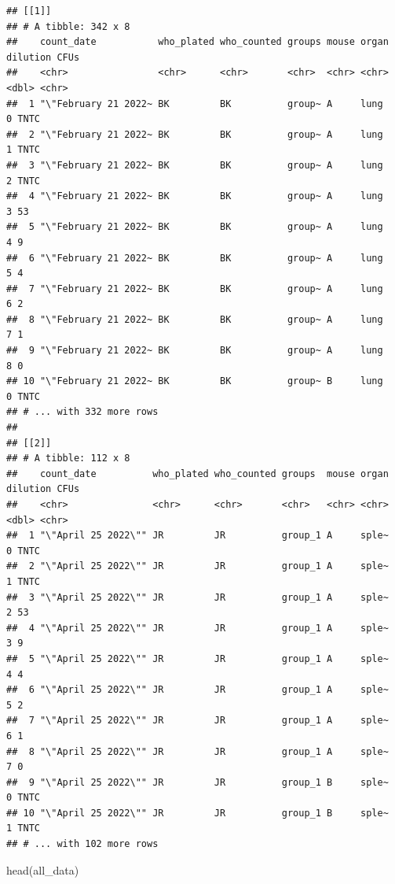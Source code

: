 \documentclass[
]{book}
\newenvironment{Shaded}{\begin{snugshade}}{\end{snugshade}}
\newcommand{\FunctionTok}[1]{\textcolor[rgb]{0.00,0.00,0.00}{#1}}
\newcommand{\NormalTok}[1]{#1}
\begin{document}
\begin{verbatim}
## [[1]]
## # A tibble: 342 x 8
##    count_date           who_plated who_counted groups mouse organ dilution CFUs 
##    <chr>                <chr>      <chr>       <chr>  <chr> <chr>    <dbl> <chr>
##  1 "\"February 21 2022~ BK         BK          group~ A     lung         0 TNTC 
##  2 "\"February 21 2022~ BK         BK          group~ A     lung         1 TNTC 
##  3 "\"February 21 2022~ BK         BK          group~ A     lung         2 TNTC 
##  4 "\"February 21 2022~ BK         BK          group~ A     lung         3 53   
##  5 "\"February 21 2022~ BK         BK          group~ A     lung         4 9    
##  6 "\"February 21 2022~ BK         BK          group~ A     lung         5 4    
##  7 "\"February 21 2022~ BK         BK          group~ A     lung         6 2    
##  8 "\"February 21 2022~ BK         BK          group~ A     lung         7 1    
##  9 "\"February 21 2022~ BK         BK          group~ A     lung         8 0    
## 10 "\"February 21 2022~ BK         BK          group~ B     lung         0 TNTC 
## # ... with 332 more rows
## 
## [[2]]
## # A tibble: 112 x 8
##    count_date          who_plated who_counted groups  mouse organ dilution CFUs 
##    <chr>               <chr>      <chr>       <chr>   <chr> <chr>    <dbl> <chr>
##  1 "\"April 25 2022\"" JR         JR          group_1 A     sple~        0 TNTC 
##  2 "\"April 25 2022\"" JR         JR          group_1 A     sple~        1 TNTC 
##  3 "\"April 25 2022\"" JR         JR          group_1 A     sple~        2 53   
##  4 "\"April 25 2022\"" JR         JR          group_1 A     sple~        3 9    
##  5 "\"April 25 2022\"" JR         JR          group_1 A     sple~        4 4    
##  6 "\"April 25 2022\"" JR         JR          group_1 A     sple~        5 2    
##  7 "\"April 25 2022\"" JR         JR          group_1 A     sple~        6 1    
##  8 "\"April 25 2022\"" JR         JR          group_1 A     sple~        7 0    
##  9 "\"April 25 2022\"" JR         JR          group_1 B     sple~        0 TNTC 
## 10 "\"April 25 2022\"" JR         JR          group_1 B     sple~        1 TNTC 
## # ... with 102 more rows
\end{verbatim}

\begin{Shaded}
\begin{Highlighting}[]
\FunctionTok{head}\NormalTok{(all\_data)}
\end{Highlighting}
\end{Shaded}
\end{document}
